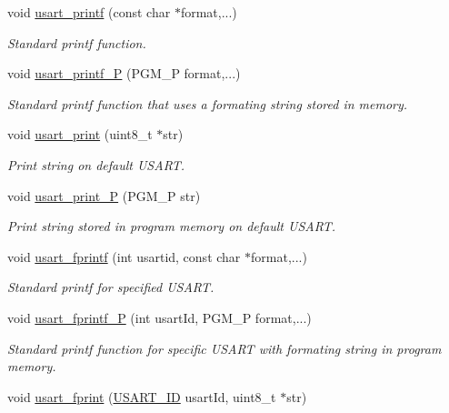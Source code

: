 \begin{DoxyCompactItemize}
void \hyperlink{group__usart_async_module_ga505b60744b81631de13750ca9f5ea1c4}{usart\+\_\+printf} (const char $\ast$format,...)
\begin{DoxyCompactList}\small\item\em Standard printf function. \end{DoxyCompactList}\item 
void \hyperlink{group__usart_async_module_ga0441186875e726f93752dd8e0e95f443}{usart\+\_\+printf\+\_\+P} (P\+G\+M\+\_\+P format,...)
\begin{DoxyCompactList}\small\item\em Standard printf function that uses a formating string stored in memory. \end{DoxyCompactList}\item 
void \hyperlink{group__usart_async_module_ga0f8fdf3d9f7e325fe2297730661facfa}{usart\+\_\+print} (uint8\+\_\+t $\ast$str)
\begin{DoxyCompactList}\small\item\em Print string on default U\+S\+A\+RT. \end{DoxyCompactList}\item 
void \hyperlink{group__usart_async_module_gae30cd27e2ce82fdb87f06b7460a21b4a}{usart\+\_\+print\+\_\+P} (P\+G\+M\+\_\+P str)
\begin{DoxyCompactList}\small\item\em Print string stored in program memory on default U\+S\+A\+RT. \end{DoxyCompactList}\item 
void \hyperlink{group__usart_async_module_ga7429cdd4ac36c036e982817d6750ed34}{usart\+\_\+fprintf} (int usartid, const char $\ast$format,...)
\begin{DoxyCompactList}\small\item\em Standard printf for specified U\+S\+A\+RT. \end{DoxyCompactList}\item 
void \hyperlink{group__usart_async_module_ga2b66e28588b8e2d1f92b9f3273608964}{usart\+\_\+fprintf\+\_\+P} (int usart\+Id, P\+G\+M\+\_\+P format,...)
\begin{DoxyCompactList}\small\item\em Standard printf function for specific U\+S\+A\+RT with formating string in program memory. \end{DoxyCompactList}\item 
void \hyperlink{group__usart_async_module_ga5598cc3783a39c313bc27baa10cf9952}{usart\+\_\+fprint} (\hyperlink{group__usart_async_module_gaae3c5ea77a411e5f40e4377f77067b86}{U\+S\+A\+R\+T\+\_\+\+ID} usart\+Id, uint8\+\_\+t $\ast$str)

\end{DoxyCompactItemize}
